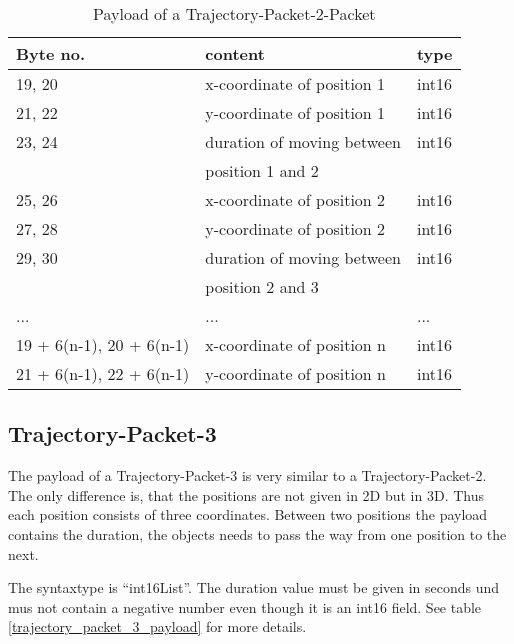 \begin{table}[htdp]
 \begin{center}
    \begin{tabular}{l|l|l}
      \textbf{Byte no.} & \textbf{content} & \textbf{type} \\
      \hline
      \hline
      19, 20 & x-coordinate of position 1 & int16 \\
      \hline
      21, 22 & y-coordinate of position 1 & int16 \\
      \hline
      23, 24 & duration of moving between & int16\\
      & position 1 and 2 & \\
      \hline
      25, 26 & x-coordinate of position 2 & int16 \\
      \hline
      27, 28 & y-coordinate of position 2 & int16 \\
      \hline
      29, 30 & duration of moving between & int16 \\
      &  position 2 and 3 & \\
      \hline
      ... & ... & ... \\
      \hline
      19 + 6(n-1), 20 + 6(n-1) & x-coordinate of position n & int16 \\
      \hline
      21 + 6(n-1), 22 + 6(n-1) & y-coordinate of position n & int16 \\
      \hline
    \end{tabular}
    \caption{Payload of a Trajectory-Packet-2-Packet}
    \label{trajectory_packet_2_payload}
  \end{center}
\end{table}

\subsection{Trajectory-Packet-3}
\label{subsection:trajectory3d}

The payload of a Trajectory-Packet-3 is very similar to a Trajectory-Packet-2. The only difference is, that the positions
are not given in 2D but in 3D. Thus each position consists of three coordinates. Between two positions the payload contains
the duration, the objects needs to pass the way from one position to the next.  

The syntaxtype is ``int16List''. The duration value must be given in seconds und mus not contain a negative number
even though it is an int16 field. See table \ref{trajectory_packet_3_payload} for more details.

